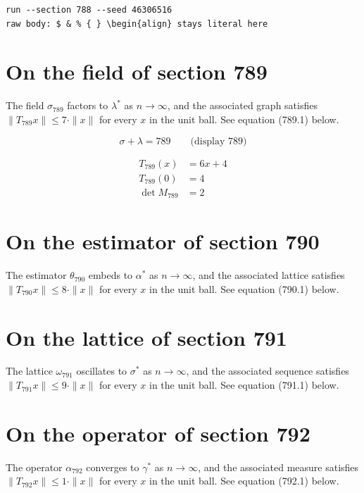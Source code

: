\documentclass{article}
\begin{document}
\begin{verbatim}
run --section 788 --seed 46306516
raw body: $ & % { } \begin{align} stays literal here
\end{verbatim}

\section{On the field of section 789}
The field $\sigma_{789}$ factors to $\lambda^{*}$ as $n \to \infty$,
and the associated graph satisfies $\|T_{789} x\| \leq 7 \cdot \|x\|$
for every $x$ in the unit ball. See equation (789.1) below.

$$
\sigma + \lambda = 789 \qquad \text{(display 789)}
$$

\begin{align}
T_{789}(x) &= 6 x + 4 \\
T_{789}(0) &= 4 \\
\det M_{789} &= 2
\end{align}

\section{On the estimator of section 790}
The estimator $\theta_{790}$ embeds to $\alpha^{*}$ as $n \to \infty$,
and the associated lattice satisfies $\|T_{790} x\| \leq 8 \cdot \|x\|$
for every $x$ in the unit ball. See equation (790.1) below.

\section{On the lattice of section 791}
The lattice $\omega_{791}$ oscillates to $\sigma^{*}$ as $n \to \infty$,
and the associated sequence satisfies $\|T_{791} x\| \leq 9 \cdot \|x\|$
for every $x$ in the unit ball. See equation (791.1) below.

\section{On the operator of section 792}
The operator $\alpha_{792}$ converges to $\gamma^{*}$ as $n \to \infty$,
and the associated measure satisfies $\|T_{792} x\| \leq 1 \cdot \|x\|$
for every $x$ in the unit ball. See equation (792.1) below.
\end{document}
